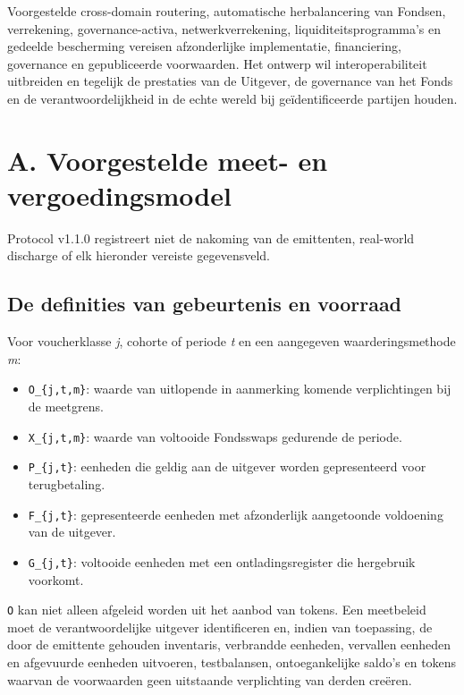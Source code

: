 \documentclass[11pt]{article}
\begin{document}
Voorgestelde cross-domain routering, automatische herbalancering van Fondsen, verrekening, governance-activa, netwerkverrekening, liquiditeitsprogramma's en gedeelde bescherming vereisen afzonderlijke implementatie, financiering, governance en gepubliceerde voorwaarden. Het ontwerp wil interoperabiliteit uitbreiden en tegelijk de prestaties van de Uitgever, de governance van het Fonds en de verantwoordelijkheid in de echte wereld bij geïdentificeerde partijen houden.


\section*{A. Voorgestelde meet- en vergoedingsmodel}

Protocol v1.1.0 registreert niet de nakoming van de emittenten, real-world discharge of elk hieronder vereiste gegevensveld.

\subsection*{De definities van gebeurtenis en voorraad}

Voor voucherklasse \emph{j}, cohorte of periode \emph{t} en een aangegeven waarderingsmethode \emph{m}:

\begin{itemize}[leftmargin=*]
\item \texttt{O\_\{j,t,m\}}: waarde van uitlopende in aanmerking komende verplichtingen bij de meetgrens.
\item \texttt{X\_\{j,t,m\}}: waarde van voltooide Fondsswaps gedurende de periode.
\item \texttt{P\_\{j,t\}}: eenheden die geldig aan de uitgever worden gepresenteerd voor terugbetaling.
\item \texttt{F\_\{j,t\}}: gepresenteerde eenheden met afzonderlijk aangetoonde voldoening van de uitgever.
\item \texttt{G\_\{j,t\}}: voltooide eenheden met een ontladingsregister die hergebruik voorkomt.
\end{itemize}
\texttt{O} kan niet alleen afgeleid worden uit het aanbod van tokens. Een meetbeleid moet de verantwoordelijke uitgever identificeren en, indien van toepassing, de door de emittente gehouden inventaris, verbrandde eenheden, vervallen eenheden en afgevuurde eenheden uitvoeren, testbalansen, ontoegankelijke saldo's en tokens waarvan de voorwaarden geen uitstaande verplichting van derden creëren.
\end{document}
